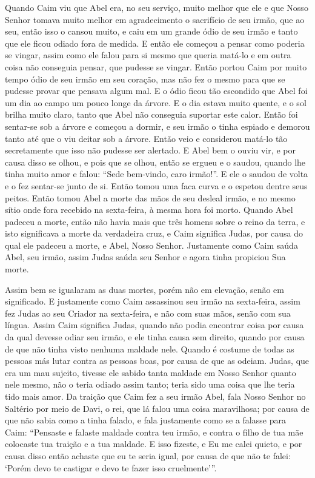 Quando Caim viu que Abel era, no seu serviço, muito melhor que ele e que Nosso
Senhor tomava muito melhor em agradecimento o sacrifício de seu irmão, que ao
seu, então isso o cansou muito, e caiu em um grande ódio de seu irmão e tanto
que ele ficou odiado fora de medida. E então ele começou a pensar como poderia
se vingar, assim como ele falou para si mesmo que queria matá-lo e em outra
coisa não conseguia pensar, que pudesse se vingar. Então portou Caim por muito
tempo ódio de seu irmão em seu coração, mas não fez o mesmo para que se pudesse
provar que pensava algum mal. E o ódio ficou tão escondido que Abel foi um dia
ao campo um pouco longe da árvore. E o dia estava muito quente, e o sol brilha
muito claro, tanto que Abel não conseguia suportar este calor. Então foi
sentar-se sob a árvore e começou a dormir, e seu irmão o tinha espiado e
demorou tanto até que o viu deitar sob a árvore. Então veio e considerou
matá-lo tão secretamente que isso não pudesse ser alertado. E Abel bem o ouviu
vir, e por causa disso se olhou, e pois que se olhou, então se ergueu e o
saudou, quando lhe tinha muito amor e falou: “Sede bem-vindo, caro irmão!”. E
ele o saudou de volta e o fez sentar-se junto de si. Então tomou uma faca curva
e o espetou dentre seus peitos. Então tomou Abel a morte das mãos de seu
desleal irmão, e no mesmo sítio onde fora recebido na sexta-feira, à mesma hora
foi morto. Quando Abel padeceu a morte, então não havia mais que três homens
sobre o reino da terra, e isto significava a morte da verdadeira cruz, e Caim
significa Judas, por causa do qual ele padeceu a morte, e Abel, Nosso Senhor.
Justamente como Caim saúda Abel, seu irmão, assim Judas saúda seu Senhor e
agora tinha propiciou Sua morte.

Assim bem se igualaram as duas mortes, porém não em elevação, senão em
significado. E justamente como Caim assassinou seu irmão na sexta-feira, assim
fez Judas ao seu Criador na sexta-feira, e não com suas mãos, senão com sua
língua. Assim Caim significa Judas, quando não podia encontrar coisa por causa
da qual devesse odiar seu irmão, e ele tinha causa sem direito, quando por
causa de que não tinha visto nenhuma maldade nele. Quando é costume de todas as
pessoas más lutar contra as pessoas boas, por causa de que as odeiam. Judas,
que era um mau sujeito, tivesse ele sabido tanta maldade em Nosso Senhor quanto
nele mesmo, não o teria odiado assim tanto; teria sido uma coisa que lhe teria
tido mais amor. Da traição que Caim fez a seu irmão Abel, fala Nosso Senhor no
Saltério por meio de Davi, o rei, que lá falou uma coisa maravilhosa; por causa
de que não sabia como a tinha falado, e fala justamente como se a falasse para
Caim: “Pensaste e falaste maldade contra teu irmão, e contra o filho de tua mãe
colocaste tua traição e a tua maldade. E isso fizeste, e Eu me calei quieto, e
por causa disso então achaste que eu te seria igual, por causa de que não te
falei: ‘Porém devo te castigar e devo te fazer isso cruelmente’”. 

